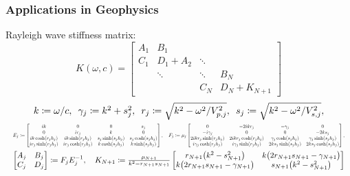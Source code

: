 \documentclass[xcolor=svgnames]{beamer}
\newcommand{\fitwidth}[1]{\resizebox{\ifdim\width>\linewidth\linewidth\else\width\fi}{!}{#1}}
\begin{document}
\begin{frame}
    \frametitle{Applications in Geophysics}
    Rayleigh wave stiffness matrix:\vfill
    \[
        K(\omega, c) = \begin{bmatrix}
            A_1 & B_1 & & \\
            C_1 & D_1 + A_2 & \ddots & \\
            & \ddots & \ddots & B_N \\
            & & C_N & D_N + K_{N + 1}
        \end{bmatrix}
    \]
    \vfill
    \begin{gather*}
        \fitwidth{$
        k \coloneqq \omega / c, \enspace
        \gamma_j \coloneqq k^2 + s_j^2, \enspace
        r_j \coloneqq \sqrt{k^2 - \omega^2 / V_{p, j}^2}, \enspace
        s_j \coloneqq \sqrt{k^2 - \omega^2 / V_{s, j}^2},
        $} \\
        \fitwidth{$
        E_j \coloneqq \begin{bmatrix}
            ik & 0 & 0 & s_j \\
            0 & i r_j & k & 0 \\
            ik \cosh(r_j h_j) & ik \sinh(r_j h_j) & s_j \sinh(s_j h_j) & s_j \cosh(s_j h_j) \\
            i r_j \sinh(r_j h_j) & i r_j \cosh(r_j h_j) & k \cosh(s_j h_j) & k \sinh(s_j h_j)
        \end{bmatrix}, \quad
        F_j \coloneqq \mu_j \begin{bmatrix}
            0 & -2ik r_j & -\gamma_j & 0 \\
            -i \gamma_j & 0 & 0 & -2k s_j \\
            2ik r_j \sinh(r_j h_j) & 2ik r_j \cosh(r_j h_j) & \gamma_j \cosh(s_j h_j) & \gamma_j \sinh(s_j h_j) \\
            i \gamma_j \cosh(r_j h_j) & i \gamma_j \sinh(r_j h_j) & 2k s_j \sinh(s_j h_j) & 2k s_j \cosh(s_j h_j)
        \end{bmatrix},
        $} \\
        \fitwidth{$
        \begin{bmatrix}
            A_j & B_j \\
            C_j & D_j
        \end{bmatrix} \coloneqq F_j E_j^{-1}, \quad
        K_{N + 1} \coloneqq \frac{\mu_{N + 1}}{k^2 - r_{N + 1} s_{N + 1}} \begin{bmatrix}
            r_{N + 1} \bigl(k^2 - s_{N + 1}^2\bigr) & k \bigl(2 r_{N + 1} s_{N + 1} - \gamma_{N + 1}\bigr) \\
            k \bigl(2 r_{N + 1} s_{N + 1} - \gamma_{N + 1}\bigr) & s_{N + 1} \bigl(k^2 - s_{N + 1}^2\bigr)
        \end{bmatrix}
        $}
    \end{gather*}
\end{frame}
\end{document}
